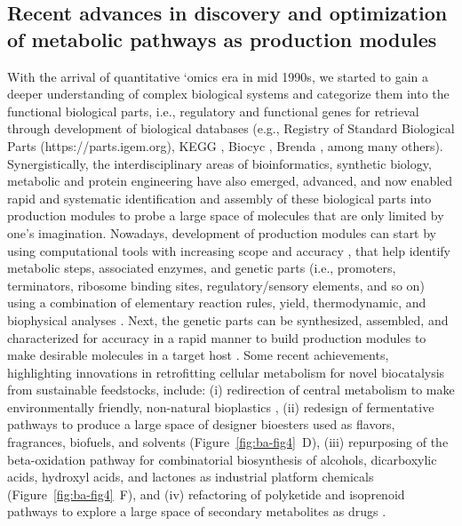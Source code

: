 \subsection{Recent advances in discovery and optimization of metabolic pathways as production modules}

With the arrival of quantitative `omics era in mid 1990s, we started to gain a deeper understanding of complex biological systems and categorize them into the functional biological parts, i.e., regulatory and functional genes for retrieval through development of biological databases (e.g., Registry of Standard Biological Parts (https://parts.igem.org), KEGG \citep{kanehisa2000}, Biocyc \citep{caspi2013}, Brenda \citep{scheer2010}, among many others).
Synergistically, the interdisciplinary areas of bioinformatics, synthetic biology, metabolic and protein engineering have also emerged, advanced, and now enabled rapid and systematic identification and assembly of these biological parts into production modules to probe a large space of molecules that are only limited by one's imagination.
Nowadays, development of production modules can start by using computational tools with increasing scope and accuracy \citep{kumar2018, wang2017}, that help identify metabolic steps, associated enzymes, and genetic parts (i.e., promoters, terminators, ribosome binding sites, regulatory/sensory elements, and so on) using a combination of elementary reaction rules, yield, thermodynamic, and biophysical analyses \citep{dugar2011, kumar2018}.
Next, the genetic parts can be synthesized, assembled, and characterized for accuracy in a rapid manner to build production modules to make desirable molecules in a target host \citep{annaluru2014, bitinaite2007, blake2010, chen2013, colloms2014, gibson2009, kok2014, li2005, li2007, shao2009, trubitsyna2014, tsuge2003, zhang2012b}.
Some recent achievements, highlighting innovations in retrofitting cellular metabolism for novel biocatalysis from sustainable feedstocks, include: (i) redirection of central metabolism to make environmentally friendly, non-natural bioplastics \citep{rehm2010}, (ii) redesign of fermentative pathways to produce a large space of designer bioesters used as flavors, fragrances, biofuels, and solvents \citep{layton2014, rodriguez2014} (Figure~\ref{fig:ba-fig4}~D), (iii) repurposing of the beta-oxidation pathway for combinatorial biosynthesis of alcohols, dicarboxylic acids, hydroxyl acids, and lactones as industrial platform chemicals \citep{cheong2016} (Figure~\ref{fig:ba-fig4}~F), and (iv) refactoring of polyketide and isoprenoid pathways to explore a large space of secondary metabolites as drugs \citep{ajikumar2010, galanie2015, martin2003}.

